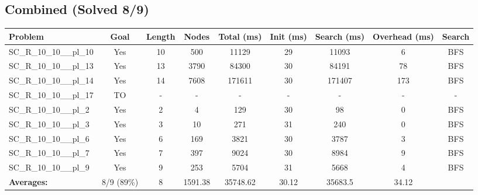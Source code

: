 \documentclass{article}
\begin{document}
\subsection*{Combined (Solved 8/9)}
\begin{tabular}{lcccccccc}
\toprule
Problem & Goal & Length & Nodes & Total (ms) & Init (ms) & Search (ms) & Overhead (ms) & Search \\
\midrule
SC\_R\_10\_10\_\_pl\_10 & Yes & 10 & 500 & 11129 & 29 & 11093 & 6 & BFS \\
SC\_R\_10\_10\_\_pl\_13 & Yes & 13 & 3790 & 84300 & 30 & 84191 & 78 & BFS \\
SC\_R\_10\_10\_\_pl\_14 & Yes & 14 & 7608 & 171611 & 30 & 171407 & 173 & BFS \\
SC\_R\_10\_10\_\_pl\_17 & TO & - & - & - & - & - & - & - \\
SC\_R\_10\_10\_\_pl\_2 & Yes & 2 & 4 & 129 & 30 & 98 & 0 & BFS \\
SC\_R\_10\_10\_\_pl\_3 & Yes & 3 & 10 & 271 & 31 & 240 & 0 & BFS \\
SC\_R\_10\_10\_\_pl\_6 & Yes & 6 & 169 & 3821 & 30 & 3787 & 3 & BFS \\
SC\_R\_10\_10\_\_pl\_7 & Yes & 7 & 397 & 9024 & 30 & 8984 & 9 & BFS \\
SC\_R\_10\_10\_\_pl\_9 & Yes & 9 & 253 & 5704 & 31 & 5668 & 4 & BFS \\
\textbf{Averages:} & 8/9 (89\%) & 8 & 1591.38 & 35748.62 & 30.12 & 35683.5 & 34.12 & \\
\bottomrule
\end{tabular}
\\[0.7cm]
\end{document}
